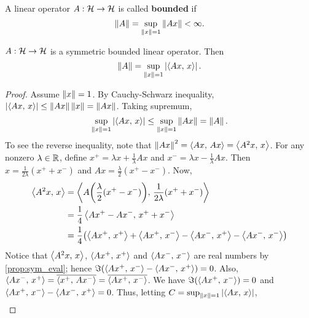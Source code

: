 \begin{definition}
    A linear operator $A:\mathcal{H}\to\mathcal{H}$ is called \textbf{bounded} if 
    \begin{equation*}
        \left\lVert {A} \right\rVert = \sup_{\left\lVert {x} \right\rVert=1}\left\lVert {Ax} \right\rVert < \infty.
    \end{equation*}
\end{definition}

\begin{proposition}\label{prop:sym_norm}
    $A:\mathcal{H}\to\mathcal{H}$ is a symmetric bounded linear operator. Then 
    \begin{equation*}
        \left\lVert {A} \right\rVert = \sup_{\left\lVert {x} \right\rVert = 1} \left\lvert {\left\langle {Ax},\, {x} \right\rangle} \right\rvert.
    \end{equation*}
\end{proposition}
\begin{proof}
    Assume $\left\lVert {x} \right\rVert = 1$. By Cauchy-Schwarz inequality, $\left\lvert {\left\langle {Ax},\, {x} \right\rangle} \right\rvert 
    \leq \left\lVert {Ax} \right\rVert\left\lVert {x} \right\rVert = \left\lVert {Ax} \right\rVert$. Taking supremum, 
    \begin{equation*}
        \sup_{\left\lVert {x} \right\rVert = 1}\left\lvert {\left\langle {Ax},\, {x} \right\rangle} \right\rvert \leq \sup_{\left\lVert {x} \right\rVert = 1}\left\lVert {Ax} \right\rVert 
        = \left\lVert {A} \right\rVert.
    \end{equation*}
    To see the reverse inequality, note that $\left\lVert {Ax} \right\rVert^2 = \left\langle {Ax},\, {Ax} \right\rangle 
    = \left\langle {A^2x},\, {x} \right\rangle$. For any nonzero $\lambda\in\mathbb{R}$, define $x^+ 
    = \lambda x + \frac{1}{\lambda}Ax$ and $x^- = \lambda x - \frac{1}{\lambda}Ax$. 
    Then $x = \frac{1}{2\lambda}(x^++x^-)$ and $Ax = \frac{\lambda}{2}(x^+-x^-)$. 
    Now, 
    \begin{equation*}
        \begin{split}
            \inp{A^2x}{x} &= \inp{A\pth{\frac{\lambda}{2}(x^+-x^-)}}{\frac{1}{2\lambda}(x^++x^-)} \\
            &= \frac{1}{4}\inp{Ax^+-Ax^-}{x^++x^-} \\ 
            &= \frac{1}{4}\pth{\inp{Ax^+}{x^+} + \inp{Ax^+}{x^-} - \inp{Ax^-}{x^+} - \inp{Ax^-}{x^-}} 
        \end{split}
    \end{equation*}
    Notice that $\left\langle {A^2x},\, {x} \right\rangle$, $\left\langle {Ax^+},\, {x^+} \right\rangle$ and $\left\langle {Ax^-},\, {x^-} \right\rangle$ are 
    real numbers by \cref{prop:sym_eval}; hence 
    $\Im\pth{\inp{Ax^+}{x^-} - \inp{Ax^-}{x^+}} = 0$. Also, $\left\langle {Ax^-},\, {x^+} \right\rangle 
    = \overline{\left\langle {x^+},\, {Ax^-} \right\rangle} = \overline{\left\langle {Ax^+},\, {x^-} \right\rangle}$. We have 
    $\Im\pth{\inp{Ax^+}{x^-}} = 0$ and $\left\langle {Ax^+},\, {x^-} \right\rangle - \left\langle {Ax^-},\, {x^+} \right\rangle = 0$. 
    Thus, letting $C = \sup_{\left\lVert {x} \right\rVert = 1}\left\lvert {\left\langle {Ax},\, {x} \right\rangle} \right\rvert$, 
    \begin{equation*}
        \begin{split}

\end{split}
\end{equation*}
\end{proof}
